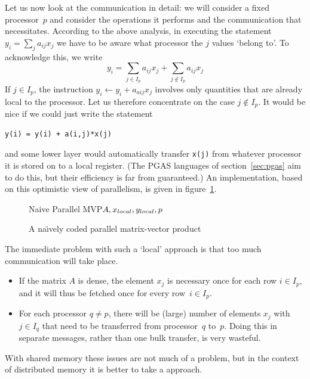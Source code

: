 Let us now look at the communication in detail: we will consider a
fixed processor~$p$ and consider the operations it performs and the
communication that necessitates.
According to the above analysis,
in executing the statement $y_i=\sum_ja_{ij}x_j$ we have
to be aware what processor the $j$ values `belong to'. To acknowledge
this, we write
\begin{equation}
  y_i=\sum_{j\in I_p}a_{ij}x_j+\sum_{j\not\in I_p}a_{ij}x_j
  \label{eq:yi=sum-in-and-not}
\end{equation}
If $j\in I_p$, the instruction $y_i \leftarrow y_i + a_{aij} x_j$
involves only quantities that are already local to
the processor.
Let us therefore concentrate on the case
$j\not\in I_p$.
It would be nice if we could just write the statement
\begin{verbatim}
y(i) = y(i) + a(i,j)*x(j)
\end{verbatim}
and some lower layer would automatically transfer \verb+x(j)+ from
whatever processor it is stored on to a local register. (The PGAS
languages of section~\ref{sec:pgas} aim to do this, but their
efficiency is far from guaranteed.) An implementation, based on this
optimistic view of parallelism, is given in figure~\ref{fig:naive-pmvp}.

\begin{figure}
  \begin{displayprocedure}{Naive Parallel MVP}{$A,x_{\mathrm\scriptstyle local},y_{\mathrm\scriptstyle local},p$}
  \end{displayprocedure}
  \caption{A na\"\i vely coded parallel matrix-vector product}
  \label{fig:naive-pmvp}
\end{figure}

The immediate problem with such a
`local' approach is that too much communication will take place.
\begin{itemize}
\item If the matrix $A$ is dense, the element $x_j$ is necessary once
  for each row $i\in I_p$, and it will thus be fetched once for every
  row~$i\in I_p$.
\item For each processor $q\not=p$, there will be (large) number of
  elements $x_j$ with $j\in I_q$ that need to be transferred from
  processor~$q$ to~$p$. Doing this in separate messages, rather than
  one bulk transfer, is very wasteful.
\end{itemize}
With shared memory these issues are not much of a problem, but in the
context of distributed memory it is better to take a
 approach.

